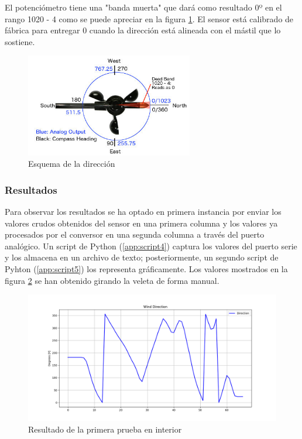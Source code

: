 \documentclass[a4paper, 11pt]{article}
\begin{document}
El potenciómetro tiene una "banda muerta" que dará como resultado 0º en el rango 1020 - 4 como se puede apreciar en la figura \ref{fig:direction}. El sensor está calibrado de fábrica para entregar 0 cuando la dirección está alineada con el mástil que lo sostiene.

\begin{figure}[h]
	\center
	\includegraphics[width=0.65\textwidth]{img/direction.jpg}
	\caption{Esquema de la dirección}
	\label{fig:direction}
\end{figure}

\subsubsection{Resultados}
Para observar los resultados se ha optado en primera instancia por enviar los valores crudos obtenidos del sensor en una primera columna y los valores ya procesados por el conversor en una segunda columna a través del puerto analógico. Un script de Python (\ref{app:script4}) captura los valores del puerto serie y los almacena en un archivo de texto; posteriormente, un segundo script de Pyhton (\ref{app:script5}) los representa gráficamente. Los valores mostrados en la figura \ref{fig:testdirection1} se han obtenido girando la veleta de forma manual.

\begin{figure}[h]
	\center
	\includegraphics[width=1\textwidth]{img/testDirectionInEN.png}
	\caption{Resultado de la primera prueba en interior}
	\label{fig:testdirection1}
\end{figure}
\end{document}
